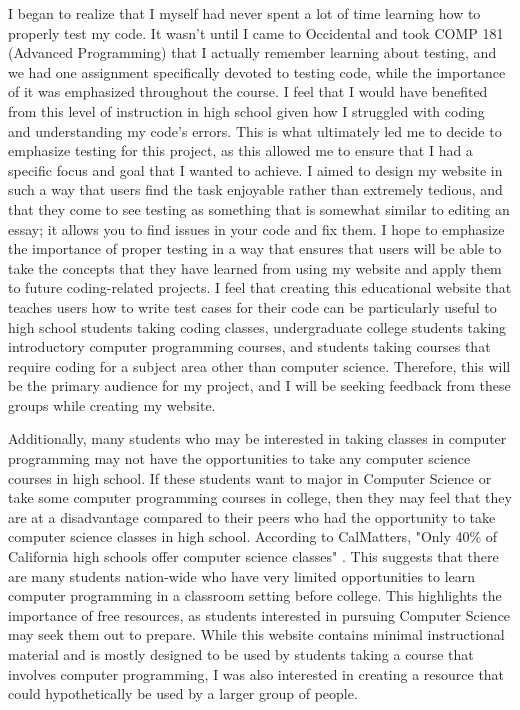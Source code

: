 \documentclass[10pt,twocolumn]{article}
\begin{document}
I began to realize that I myself had never spent a lot of time learning how to properly test my code. It wasn’t until I came to Occidental and took COMP 181 (Advanced Programming) that I actually remember learning about testing, and we had one assignment specifically devoted to testing code, while the importance of it was emphasized throughout the course. I feel that I would have benefited from this level of instruction in high school given how I struggled with coding and understanding my code's errors. This is what ultimately led me to decide to emphasize testing for this project, as this allowed me to ensure that I had a specific focus and goal that I wanted to achieve. I aimed to design my website in such a way that users find the task enjoyable rather than extremely tedious, and that they come to see testing as something that is somewhat similar to editing an essay; it allows you to find issues in your code and fix them. I hope to emphasize the importance of proper testing in a way that ensures that users will be able to take the concepts that they have learned from using my website and apply them to future coding-related projects. I feel that creating this educational website that teaches users how to write test cases for their code can be particularly useful to high school students taking coding classes, undergraduate college students taking introductory computer programming courses, and students taking courses that require coding for a subject area other than computer science. Therefore, this will be the primary audience for my project, and I will be seeking feedback from these groups while creating my website.

Additionally, many students who may be interested in taking classes in computer programming may not have the opportunities to take any computer science courses in high school. If these students want to major in Computer Science or take some computer programming courses in college, then they may feel that they are at a disadvantage compared to their peers who had the opportunity to take computer science classes in high school. According to CalMatters, "Only 40\% of California high schools offer computer science classes" \cite{California}. This suggests that there are many students nation-wide who have very limited opportunities to learn computer programming in a classroom setting before college. This highlights the importance of free resources, as students interested in pursuing Computer Science may seek them out to prepare. While this website contains minimal instructional material and is mostly designed to be used by students taking a course that involves computer programming, I was also interested in creating a resource that could hypothetically be used by a larger group of people.
\end{document}
